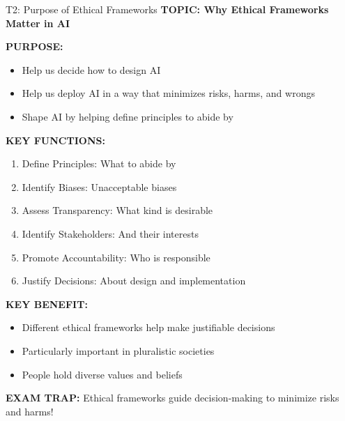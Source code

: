\documentclass[8pt]{beamer}
\begin{document}
	\begin{frame}{T2: Purpose of Ethical Frameworks}
		\fontsize{6.5}{7.5}\selectfont
		\textbf{TOPIC: Why Ethical Frameworks Matter in AI}
		
		\vspace{0.1cm}
		\textbf{PURPOSE:}
		\begin{itemize}
			\item Help us decide how to design AI
			\item Help us deploy AI in a way that minimizes risks, harms, and wrongs
			\item Shape AI by helping define principles to abide by
		\end{itemize}
		
		\vspace{0.1cm}
		\textbf{KEY FUNCTIONS:}
		\begin{enumerate}
			\item \textcolor{myblue}{Define Principles:} What to abide by
			\item \textcolor{myblue}{Identify Biases:} Unacceptable biases
			\item \textcolor{myblue}{Assess Transparency:} What kind is desirable
			\item \textcolor{myblue}{Identify Stakeholders:} And their interests
			\item \textcolor{myblue}{Promote Accountability:} Who is responsible
			\item \textcolor{myblue}{Justify Decisions:} About design and implementation
		\end{enumerate}
		
		\vspace{0.1cm}
		\textbf{KEY BENEFIT:}
		\begin{itemize}
			\item Different ethical frameworks help make justifiable decisions
			\item Particularly important in pluralistic societies
			\item People hold diverse values and beliefs
		\end{itemize}
		
		\textcolor{myred}{\textbf{EXAM TRAP:}} Ethical frameworks \textcolor{myblue}{guide decision-making} to minimize risks and harms!
	\end{frame}
	
\end{document}
